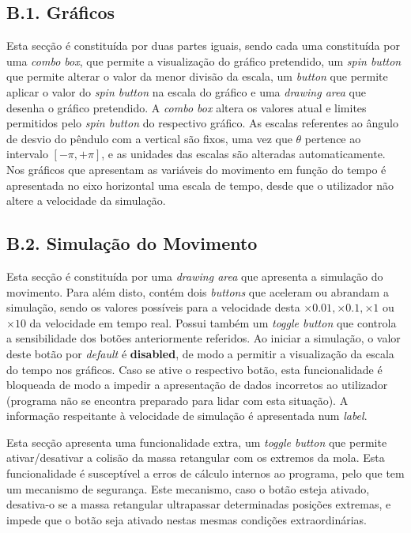 \documentclass[a4paper]{article}
\begin{document}
\subsection{ B.1. Gráficos}
\par Esta secção é constituída por duas partes iguais, sendo cada uma constituída por uma \textit{combo box}, que permite a visualização do gráfico pretendido, um \textit{spin button} que permite alterar o valor da menor divisão da escala, um \textit{button} que permite aplicar o valor do \textit{spin button} na escala do gráfico e uma \textit{drawing area} que desenha o gráfico pretendido. A \textit{combo box} altera os valores atual e limites permitidos pelo \textit{spin button} do respectivo gráfico. As escalas referentes ao ângulo de desvio do pêndulo com a vertical são fixos, uma vez que $\theta$ pertence ao intervalo $[ -\pi , +\pi ]$, e as unidades das escalas são alteradas automaticamente. Nos gráficos que apresentam as variáveis do movimento em função do tempo é apresentada no eixo horizontal uma escala de tempo, desde que o utilizador não altere a velocidade da simulação.

\subsection{ B.2. Simulação do Movimento}
\par Esta secção é constituída por uma  \textit{drawing area} que apresenta a simulação do movimento. Para além disto, contém dois \textit{buttons} que aceleram ou abrandam a simulação, sendo os valores possíveis para a velocidade desta $\times 0.01, \times0.1, \times1$ ou $\times10$ da velocidade em tempo real. Possui também um \textit{toggle button} que controla a sensibilidade dos botões anteriormente referidos. Ao iniciar a simulação, o valor deste botão por \textit{default} é \textbf{disabled}, de modo a permitir a visualização da escala do tempo nos gráficos. Caso se ative o respectivo botão, esta funcionalidade é bloqueada de modo a impedir a apresentação de dados incorretos ao utilizador (programa não se encontra preparado para lidar com esta situação). A informação respeitante à velocidade de simulação é apresentada num \textit{label}. 
\par Esta secção apresenta uma funcionalidade extra, um \textit{toggle button} que permite ativar/desativar a colisão da massa retangular com os extremos da mola. Esta funcionalidade é susceptível a erros de cálculo internos ao programa, pelo que tem um mecanismo de segurança. Este mecanismo, caso o botão esteja ativado, desativa-o se a massa retangular ultrapassar determinadas posições extremas, e impede que o botão seja ativado nestas mesmas condições extraordinárias.
\end{document}
